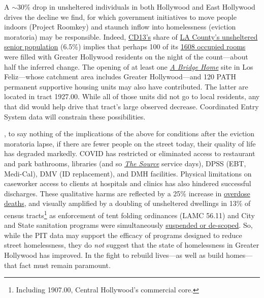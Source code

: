 \documentclass[11pt]{article}
\def\bfp{\color{magenta}}
\begin{document}
 A $\sim$30\% drop in unsheltered individuals in both Hollywood and 
East Hollywood drives the decline we find, for which government initiatives to move people indoors 
(Project Roomkey) and staunch inflow into homelessness (eviction moratoria) may be responsible. 
Indeed, \href{https://www.lahsa.org/documents?id=4672-2020-homeless-count-council-district-13}{CD13's} share of \href{https://www.lahsa.org/documents?id=4585-2020-greater-los-angeles-homeless-count-los-angeles-continuum-of-care-coc-}{LA County's unsheltered senior population} (6.5\%) implies that perhaps 100 of its \href{https://projectroomkeytracker.com/}{1608 occupied rooms} were filled with Greater Hollywood residents on the night 
of the count---about half the inferred change. The opening of at least one 
\href{https://www.lamayor.org/ABridgeHome}{\it A Bridge Home} site in Los Feliz---whose catchment area 
includes Greater Hollywood---and 120 PATH permanent supportive housing units may also have contributed. 
The latter are located in tract 1927.00. While all of those units did not go to local residents, any that did would help
drive that tract's large observed decrease. Coordinated Entry System data will constrain these possibilities.

{\bfp {\it However}, to say nothing of the implications of the above for conditions after the eviction moratoria
lapse, if there are fewer people on the street today, their quality of life has degraded markedly. COVID has restricted or 
eliminated access to restaurant and park bathrooms, libraries (and so 
\href{https://www.lapl.org/homeless-resources/the-source}{\it The Source} service days), DPSS 
(EBT, Medi-Cal), DMV (ID replacement), and DMH facilities. Physical limitations on caseworker 
access to clients at hospitals and clinics has also hindered successful discharges. These qualitative harms are reflected 
by a 25\% increase in 
\href{https://www.latimes.com/california/story/2021-01-07/the-powerful-synthetic-opioid-fentanyl-is-behind-rising-deaths-in-the-homeless-population}{overdose deaths}, and visually amplified by a doubling of unsheltered dwellings in 13\% of census 
tracts\footnote{\bfp Including 1907.00, Central Hollywood's commercial core.} as enforcement of tent folding ordinances
(LAMC 56.11) and City and State sanitation programs were simultaneously 
\href{https://clkrep.lacity.org/onlinedocs/2020/20-0147_misc_3-17-20_p.pdf}{suspended or de-scoped}.} 
So, while the PIT data may support the efficacy of programs designed to reduce street 
homelessness, they do {\it not} suggest that the state of homelessness in Greater Hollywood has improved. In the 
fight to rebuild lives---as well as build homes---that fact {\bfp must remain paramount.}
\end{document}
